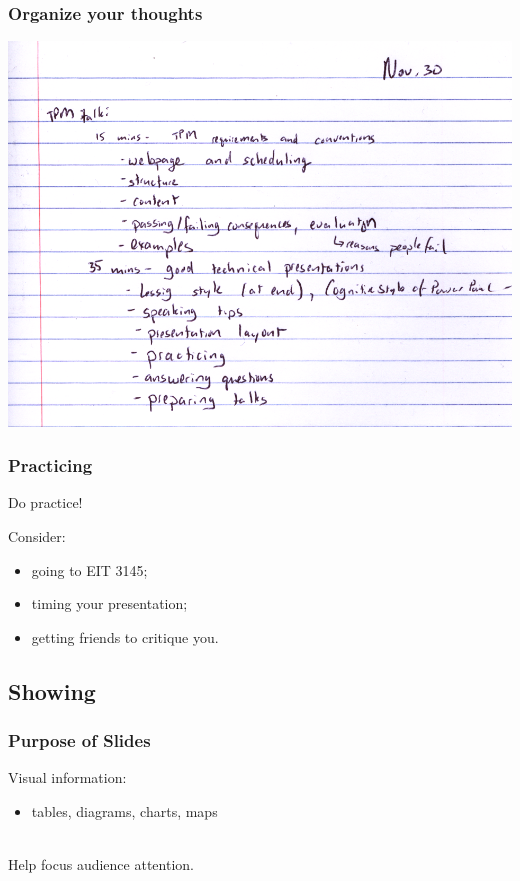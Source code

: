 \documentclass{beamer}
\begin{document}
\begin{frame}
\frametitle{Organize your thoughts}

\begin{center}
\includegraphics[height=0.8\textheight]{meta-outline}
\end{center}

\end{frame}

\begin{frame}
\frametitle{Practicing}

\begin{center}
Do practice!\\[2em]
\end{center}

Consider:
\begin{itemize}
\item going to EIT 3145;
\item timing your presentation;
\item getting friends to critique you.
\end{itemize}

\end{frame}

\subsection{Showing}

\begin{frame}
\frametitle{Purpose of Slides}

\Large

Visual information: 
\begin{itemize}
\item tables, diagrams, charts, maps
\end{itemize}
~\\[1em]

Help focus audience attention.\\[1em]

\end{frame}
\end{document}
